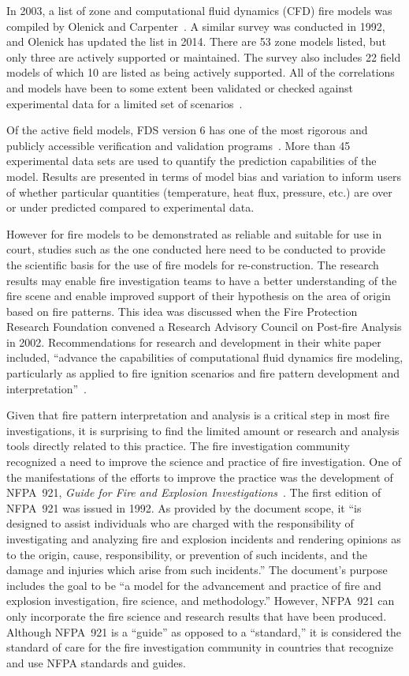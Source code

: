 \documentclass[twoside]{uocthesis}
\begin{document}
In 2003, a list of zone and computational fluid dynamics (CFD) fire models was compiled by Olenick and Carpenter~\cite{Olenick:2003}. A similar survey was conducted in 1992, and Olenick has updated the list in 2014. There are 53 zone models listed, but only three are actively supported or maintained.  The survey also includes 22 field models of which 10 are listed as being actively supported.  All of the correlations and models have been to some extent been validated or checked against experimental data for a limited set of scenarios~\cite{ASTM_E1355}.

Of the active field models, FDS version 6 has one of the most rigorous and publicly accessible verification and validation programs~\cite{McGrattan:2014}. More than 45 experimental data sets are used to quantify the prediction capabilities of the model.  Results are presented in terms of model bias and variation to inform users of whether particular quantities (temperature, heat flux, pressure, etc.) are over or under predicted compared to experimental data.

However for fire models to be demonstrated as reliable and suitable for use in court, studies such as the one conducted here need to be conducted to provide the scientific basis for the use of fire models for re-construction.  The research results may enable fire investigation teams to have a better understanding of the fire scene and enable improved support of their hypothesis on the area of origin based on fire patterns.  This idea was discussed when the Fire Protection Research Foundation convened a Research Advisory Council on Post-fire Analysis in 2002.  Recommendations for research and development in their white paper included, ``advance the capabilities of computational fluid dynamics fire modeling, particularly as applied to fire ignition scenarios and fire pattern development and interpretation''~\cite{RAC:2002}.

Given that fire pattern interpretation and analysis is a critical step in most fire investigations, it is surprising to find the limited amount or research and analysis tools directly related to this practice.  The fire investigation community recognized a need to improve the science and practice of fire investigation.  One of the manifestations of the efforts to improve the practice was the development of NFPA~921, {\em Guide for Fire and Explosion Investigations}~\cite{NFPA_921}.  The first edition of NFPA~921 was issued in 1992.  As provided by the document scope, it ``is designed to assist individuals who are charged with the responsibility of investigating and analyzing fire and explosion incidents and rendering opinions as to the origin, cause, responsibility, or prevention of such incidents, and the damage and injuries which arise from such incidents.'' The document’s purpose includes the goal to be ``a model for the advancement and practice of fire and explosion investigation, fire science, and methodology.'' However, NFPA~921 can only incorporate the fire science and research results that have been produced.  Although NFPA~921 is a ``guide'' as opposed to a ``standard,'' it is considered the standard of care for the fire investigation community in countries that recognize and use NFPA standards and guides.
\end{document}
